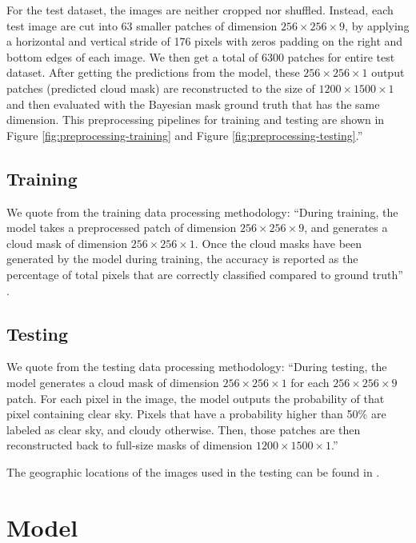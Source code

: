 \documentclass[sigplan,screen]{acmart}
\begin{document}
For the test dataset, the images are neither cropped nor shuffled. Instead, each test image are cut into 63 smaller patches of dimension $256 \times 256 \times 9$, by applying a horizontal and vertical stride of 176 pixels with zeros padding on the right and bottom edges of each image. We then get a total of $6300$ patches for entire test dataset. After getting the predictions from the model, these $256 \times 256 \times 1$ output patches (predicted cloud mask) are reconstructed to the size of $1200 \times 1500 \times 1$ and then evaluated with the Bayesian mask ground truth that has the same dimension. This preprocessing pipelines for training and testing are shown in Figure \ref{fig:preprocessing-training} and Figure \ref{fig:preprocessing-testing}.''

\subsection{Training}

We quote from \cite{las-2023-cloudmask-related} the training data processing methodology:
``During training, the model takes a preprocessed patch of dimension $256 \times 256 \times 9$, and generates a cloud mask of dimension $256 \times 256 \times 1$. Once the cloud masks have been generated by the model during training, the accuracy is reported as the percentage of total pixels that are correctly classified compared to ground truth'' \cite{las-2023-cloudmask-related}. 

\subsection{Testing}

We quote from \cite{las-2023-cloudmask-related} the testing data processing methodology:
``During testing, the model generates a cloud mask of dimension $256 \times 256 \times 1$ for each $256 \times 256 \times 9$ patch. For each pixel in the image, the model outputs the probability of that pixel containing clear sky. Pixels that have a probability higher than 50\% are labeled as clear sky, and cloudy otherwise. Then, those patches are then reconstructed back to full-size masks of dimension $1200 \times 1500 \times 1$.'' 

The geographic locations of the images used in the testing can be found in \cite{las-2023-cloudmask-related}.



\section{Model}
\end{document}
